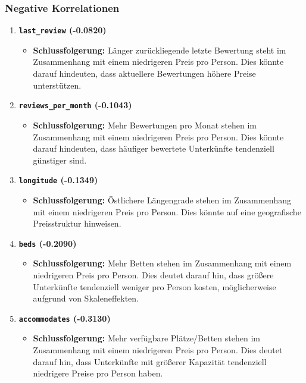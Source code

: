 \documentclass[
  journal,
]{IEEEtran}%
\providecommand{\tightlist}{%
  \setlength{\itemsep}{0pt}\setlength{\parskip}{0pt}}\usepackage{longtable,booktabs,array}
\begin{document}
\subsubsection{Negative Korrelationen}\label{negative-korrelationen-1}

\begin{enumerate}
\def\labelenumi{\arabic{enumi}.}
\item
  \textbf{\texttt{last\_review} (-0.0820)}

  \begin{itemize}
  \tightlist
  \item
    \textbf{Schlussfolgerung:} Länger zurückliegende letzte Bewertung
    steht im Zusammenhang mit einem niedrigeren Preis pro Person. Dies
    könnte darauf hindeuten, dass aktuellere Bewertungen höhere Preise
    unterstützen.
  \end{itemize}
\item
  \textbf{\texttt{reviews\_per\_month} (-0.1043)}

  \begin{itemize}
  \tightlist
  \item
    \textbf{Schlussfolgerung:} Mehr Bewertungen pro Monat stehen im
    Zusammenhang mit einem niedrigeren Preis pro Person. Dies könnte
    darauf hindeuten, dass häufiger bewertete Unterkünfte tendenziell
    günstiger sind.
  \end{itemize}
\item
  \textbf{\texttt{longitude} (-0.1349)}

  \begin{itemize}
  \tightlist
  \item
    \textbf{Schlussfolgerung:} Östlichere Längengrade stehen im
    Zusammenhang mit einem niedrigeren Preis pro Person. Dies könnte auf
    eine geografische Preisstruktur hinweisen.
  \end{itemize}
\item
  \textbf{\texttt{beds} (-0.2090)}

  \begin{itemize}
  \tightlist
  \item
    \textbf{Schlussfolgerung:} Mehr Betten stehen im Zusammenhang mit
    einem niedrigeren Preis pro Person. Dies deutet darauf hin, dass
    größere Unterkünfte tendenziell weniger pro Person kosten,
    möglicherweise aufgrund von Skaleneffekten.
  \end{itemize}
\item
  \textbf{\texttt{accommodates} (-0.3130)}

  \begin{itemize}
  \tightlist
  \item
    \textbf{Schlussfolgerung:} Mehr verfügbare Plätze/Betten stehen im
    Zusammenhang mit einem niedrigeren Preis pro Person. Dies deutet
    darauf hin, dass Unterkünfte mit größerer Kapazität tendenziell
    niedrigere Preise pro Person haben.
  \end{itemize}
\end{enumerate}
\end{document}
